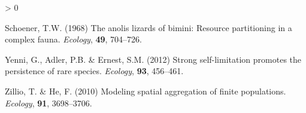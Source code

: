 \documentclass[
]{article}
\newlength{\cslhangindent}
\newenvironment{CSLReferences}[2] %
 {%
  \setlength{\parindent}{0pt}
  \ifodd #1 \everypar{\setlength{\hangindent}{\cslhangindent}}\ignorespaces\fi
  \ifnum #2 > 0
  \setlength{\parskip}{#2\baselineskip}
  \fi
 }%
 {}
\begin{document}
\begin{CSLReferences}{1}{0}
\leavevmode\hypertarget{ref-schoener1968}{}%
Schoener, T.W. (1968) The anolis lizards of bimini: Resource
partitioning in a complex fauna. \emph{Ecology}, \textbf{49}, 704--726.

\leavevmode\hypertarget{ref-yenni2012}{}%
Yenni, G., Adler, P.B. \& Ernest, S.M. (2012) Strong self-limitation
promotes the persistence of rare species. \emph{Ecology}, \textbf{93},
456--461.

\leavevmode\hypertarget{ref-zillio2010}{}%
Zillio, T. \& He, F. (2010) Modeling spatial aggregation of finite
populations. \emph{Ecology}, \textbf{91}, 3698--3706.

\end{CSLReferences}
\end{document}
